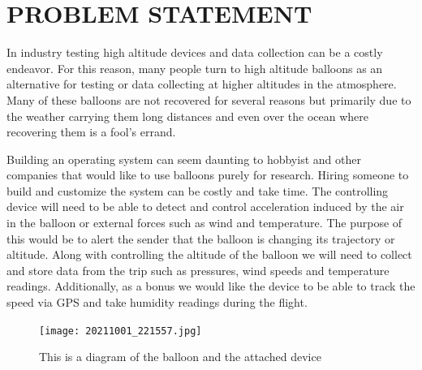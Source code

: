 \documentclass[12pt]{article}
\begin{document}


\section{PROBLEM STATEMENT}
In industry testing high altitude devices and data collection can be a costly endeavor. For this reason, many people turn to high altitude balloons as an alternative for testing or data collecting at higher altitudes in the atmosphere. Many of these balloons are not recovered for several reasons but primarily due to the weather carrying them long distances and even over the ocean where recovering them is a fool’s errand.  

Building an operating system can seem daunting to hobbyist and other companies that would like to use balloons purely for research. Hiring someone to build and customize the system can be costly and take time. The controlling device will need to be able to detect and control acceleration induced by the air in the balloon or external forces such as wind and temperature. The purpose of this would be to alert the sender that the balloon is changing its trajectory or altitude. Along with controlling the altitude of the balloon we will need to collect and store data from the trip such as pressures, wind speeds and temperature readings. Additionally, as a bonus we would like the device to be able to track the speed via GPS and take humidity readings during the flight. 

\begin{figure}[!t]
\centering
\texttt{[image: 20211001\_221557.jpg]}
\caption{This is a diagram of the balloon and the attached device \cite{Figure1}}
\label{fig:cpx}
\end{figure}
\end{document}
